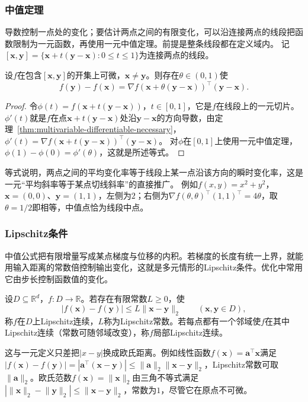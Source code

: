\subsubsection{中值定理}

导数控制一点处的变化；要估计两点之间的有限变化，可以沿连接两点的线段把函数限制为一元函数，再使用一元中值定理。前提是整条线段都在定义域内。
记$[\bm x,\bm y]=\{\bm x+t(\bm y-\bm x):0\leq t\leq1\}$为连接两点的线段。
\begin{theorem}[多元标量函数的中值公式]
\label{thm:multivariable-scalar-mean-value}
设$f$在包含$[\bm x,\bm y]$的开集上可微，$\bm x\neq\bm y$。则存在$\theta\in(0,1)$使
\[
 f(\bm y)-f(\bm x)=\nabla f(\bm x+\theta(\bm y-\bm x))^\top(\bm y-\bm x).
\]
\end{theorem}
\begin{proof}
令$\phi(t)=f(\bm x+t(\bm y-\bm x))$，$t\in[0,1]$，它是$f$在线段上的一元切片。$\phi'(t)$就是$f$在点$\bm x+t(\bm y-\bm x)$处沿$\bm y-\bm x$的方向导数，由定理~\ref{thm:multivariable-differentiable-necessary}，$\phi'(t)=\nabla f(\bm x+t(\bm y-\bm x))^\top(\bm y-\bm x)$。
对$\phi$在$[0,1]$上使用一元中值定理，$\phi(1)-\phi(0)=\phi'(\theta)$，这就是所述等式。
\end{proof}
等式说明，两点之间的平均变化率等于线段上某一点沿该方向的瞬时变化率，这是一元“平均斜率等于某点切线斜率”的直接推广。
例如$f(x,y)=x^2+y^2$，$\bm x=(0,0)$、$\bm y=(1,1)$，左侧为$2$；右侧为$\nabla f(\theta,\theta)^\top(1,1)^\top=4\theta$，取$\theta=1/2$即相等，中值点恰为线段中点。

\subsubsection{Lipschitz条件}

中值公式把有限增量写成某点梯度与位移的内积。若梯度的长度有统一上界，就能用输入距离的常数倍控制输出变化，这就是多元情形的Lipschitz条件。优化中常用它由步长控制函数值的变化。
\begin{definition}[多元函数的Lipschitz条件]
\label{def:multivariable-lipschitz}
设$D\subseteq\mathbb R^d$，$f:D\to\mathbb R$。若存在有限常数$L\geq0$，使
\[
 |f(\bm x)-f(\bm y)|\leq L\lVert\bm x-\bm y\rVert_2\qquad(\bm x,\bm y\in D),
\]
称$f$在$D$上Lipschitz连续，$L$称为Lipschitz常数。若每点都有一个邻域使$f$在其中Lipschitz连续（常数可随邻域改变），称$f$局部Lipschitz连续。
\end{definition}
这与一元定义只差把$|x-y|$换成欧氏距离。例如线性函数$f(\bm x)=\bm a^\top\bm x$满足$|f(\bm x)-f(\bm y)|=|\bm a^\top(\bm x-\bm y)|\leq\lVert\bm a\rVert_2\lVert\bm x-\bm y\rVert_2$，Lipschitz常数可取$\lVert\bm a\rVert_2$。欧氏范数$f(\bm x)=\lVert\bm x\rVert_2$由三角不等式满足$|\lVert\bm x\rVert_2-\lVert\bm y\rVert_2|\leq\lVert\bm x-\bm y\rVert_2$，常数为$1$，尽管它在原点不可微。

